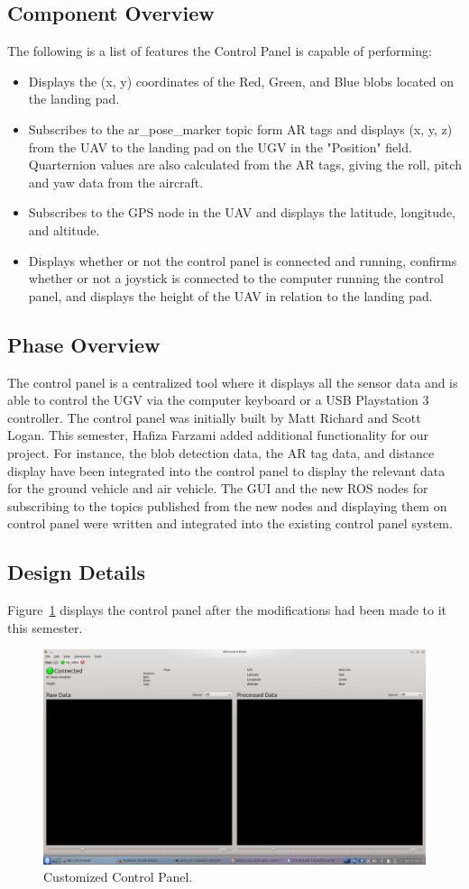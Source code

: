 \subsection{Component  Overview}
The following is a list of features the Control Panel is capable of performing:
\begin{itemize}
	\item Displays the (x, y) coordinates of the Red, Green, and Blue blobs located on the landing pad.
	\item Subscribes to the ar\_pose\_marker topic form AR tags and displays (x, y, z) from the UAV to the landing pad on the UGV in the "Position" field. Quarternion values are also calculated from the AR tags, giving the roll, pitch and yaw data from the aircraft.
	\item Subscribes to the GPS node in the UAV and displays the latitude, longitude, and altitude.
	\item Displays whether or not the control panel is connected and running, confirms whether or not a joystick is connected to the computer running the control panel, and displays the height of the UAV in relation to the landing pad.
\end{itemize}

\subsection{Phase Overview}
The control panel is a centralized tool where it displays all the sensor data and is able to control the UGV via the computer keyboard or a USB Playstation 3 controller.
The control panel was initially built by Matt Richard and Scott Logan. This semester, Hafiza Farzami added additional functionality for our project. For instance, the blob detection data, the AR tag data, and distance display have been integrated into the control panel to display the relevant data for the ground vehicle and air vehicle. The GUI and the new ROS nodes for subscribing to the topics published from the new nodes and displaying them on control panel were written and integrated into the existing control panel system.


\subsection{Design Details}
Figure~\ref{ctrlpanel} displays the control panel after the modifications had been made to it this semester.

\begin{figure}[tbh]
\begin{center}
\includegraphics[width=.5\textwidth]{resources/img/control_panel}
\end{center}
\caption{Customized Control Panel.\label{ctrlpanel}}
\end{figure}



